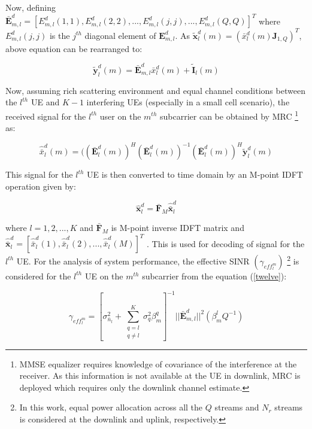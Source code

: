 \documentclass[conference]{IEEEtran}
\begin{document}
Now, defining $\mathbf{\bar{E}}^d_{m,l} = [E^d_{m,l}(1,1),E^d_{m,l}(2,2),...,E^d_{m,l}(j,j),...,E^d_{m,l}(Q,Q)]^T$ where $E^d_{m,l}(j,j)$ is the $j^{th}$ diagonal element of $\mathbf{E}^d_{m,l}$. As $\mathbf{\tilde{x}}^d_l(m) = (\bar{x}^d_{l}(m) \mathbf{J}_{1,Q})^T$, above equation can be rearranged to: \vspace{-0.50em}

\begin{equation}
       \label{eleven}
\mathbf{\tilde{y}}^d_{l} (m) = \mathbf{\bar{E}}^d_{m,l} \bar{x}^d_{l} (m) + \mathbf{\tilde{I}}_{l}(m) 
\end{equation}

Now, assuming rich scattering environment and equal channel conditions between the $l^{th}$ UE and $K-1$ interfering UEs (especially in a small cell scenario), the received signal for the $l^{th}$ user on the $m^{th}$ subcarrier can be obtained by MRC \footnote{MMSE equalizer requires knowledge of covariance of the interference at the receiver. As this information is not available at the UE in downlink, MRC is deployed which requires only the downlink channel estimate.} \cite{mrc} as:

   
   \begin{equation}
       \label{twelve}
      \hat{\bar{x}}^d_l(m)=((\mathbf{\bar{E}}^d_l(m))^H (\mathbf{\bar{E}}^d_l(m))^{-1} (\mathbf{\bar{E}}^d_l(m))^H \mathbf{\tilde{y}}^d_l(m)
       \end{equation} 
       
This signal for the $l^{th}$ UE is then converted to time domain by an M-point IDFT operation given by:

\begin{equation}
       \label{thirteen}
     \mathbf{\hat{x}}^d_l = \mathbf{\bar{F}}_M \mathbf{\hat{\bar{x}}}^d_l
       \end{equation} 
       
where $l=1,2,...,K$ and $\mathbf{\bar{F}}_M$  is M-point inverse IDFT matrix and $\mathbf{\hat{\bar{x}}}^d_l =[\hat{\bar{x}}^d_l (1), \hat{\bar{x}}^d_l (2), ...,\hat{\bar{x}}^d_l (M)]^T$ . This is used for decoding of signal for the $l^{th}$  UE. For the analysis of system performance, the effective SINR $(\gamma_{eff^m_l})$ \footnote{In this work, equal power allocation across all the $Q$ streams and $N_r$ streams is considered at the downlink and uplink, respectively.} is considered for the $l^{th}$ UE on the $m^{th}$ subcarrier from the equation (\ref{twelve}):

\begin{equation}
       \label{fourteen}
      \gamma_{eff^m_l} = [\sigma_{\bar{n}_l}^2 + \sum_{\substack{ q=l \\ q \neq l}}^{K} \sigma_q^2 \beta^q_m ]^{-1}||\mathbf{\bar{E}}^d_{m,l}||^2 (\beta^l_m Q^{-1})
       \end{equation}
\end{document}
